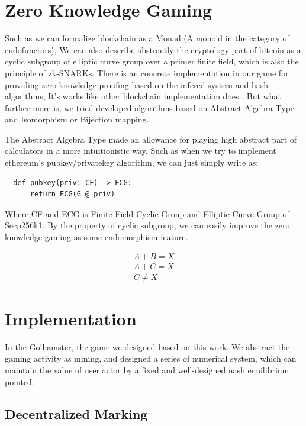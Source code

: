 \documentclass[twocolumn]{article}
\begin{document}
\section {Zero Knowledge Gaming}

Such as we can formalize blockchain as a Monad (A monoid in the category of endofunctors), We can also describe abstractly the cryptology part of bitcoin as a cyclic subgroup of elliptic curve group over a primer finite field, which is also the principle of zk-SNARKs. There is an concrete implementation in our game for providing zero-knowledge proofing based on the infered system and hash algorithms, It's works like other blockchain implementation does \cite{zcash}. But what further more is, we tried developed algorithms based on Abstract Algebra Type and Isomorphism or Bijection mapping.

The Abstract Algebra Type made an allowance for playing high abstract part of calculators in a more intuitionistic way. Such as when we try to implement ethereum's pubkey/privatekey algorithm, we can just simply write as\cite{klefki}:

\lstset{language=Python}
\begin{lstlisting}
  def pubkey(priv: CF) -> ECG:
      return ECG(G @ priv)
\end{lstlisting}

Where CF and ECG is Finite Field Cyclic Group and Elliptic Curve Group of Secp256k1. By the property of cyclic subgroup, we can easily improve the zero knowledge gaming as some endomorphism feature.

\begin{gather}
  A + B = X \\
  A + C = X \\
  C \neq X
\end{gather}

\section {Implementation}

In the Go!hamster, the game we designed based on this work. We abstract the gaming activity as mining, and designed a series of numerical system, which can maintain the value of user actor by a fixed and well-designed nash equilibrium pointed. 
\subsection {Decentralized Marking}
\end{document}
